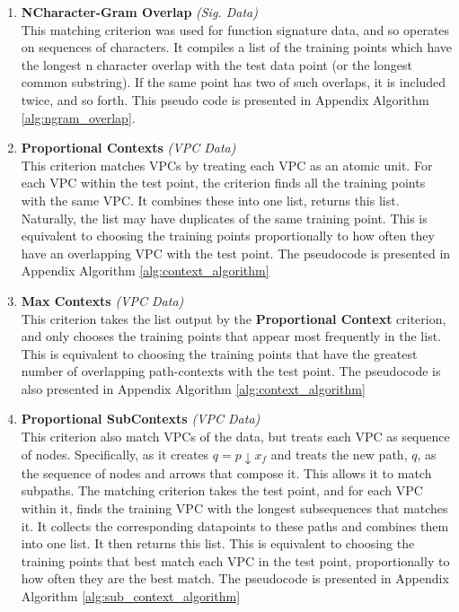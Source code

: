 \begin{enumerate}
    \item \textbf{NCharacter-Gram Overlap} \textit{(Sig. Data)} \\This matching criterion was used for function signature data, and so operates on sequences of characters. It compiles a list of the training points which have the longest n character overlap with the test data point (or the longest common substring). If the same point has two of such overlaps, it is included twice, and so forth. This pseudo code is presented in Appendix Algorithm \ref{alg:ngram_overlap}.
    \item \textbf{Proportional Contexts} \textit{(VPC Data)}\\This criterion matches VPCs by treating each VPC as an atomic unit. For each VPC within the test point, the criterion finds all the training points with the same VPC. It combines these into one list, returns this list. Naturally, the list may have duplicates of the same training point. This is equivalent to choosing the training points proportionally to how often they have an overlapping VPC with the test point. The pseudocode is presented in Appendix Algorithm \ref{alg:context_algorithm} 
    \item \textbf{Max Contexts} \textit{(VPC Data)}\\This criterion takes the list output by the \textbf{Proportional Context} criterion, and only chooses the training points that appear most frequently in the list. This is equivalent to choosing the training points that have the greatest number of overlapping path-contexts with the test point. The pseudocode is also presented in Appendix Algorithm \ref{alg:context_algorithm} 
    \item \textbf{Proportional SubContexts} \textit{(VPC Data)}\\This criterion also match VPCs of the data, but treats each VPC as sequence of nodes. Specifically, as it creates $q = p{\downarrow}x_f$ and treats the new path, $q$, as the sequence of nodes and arrows that compose it. This allows it to match subpaths. The matching criterion takes the test point, and for each VPC within it, finds the training VPC with the longest subsequences that matches it. It collects the corresponding datapoints to these paths and combines them into one list. It then returns this list. This is equivalent to choosing the training points that best match each VPC in the test point, proportionally to how often they are the best match. The pseudocode is presented in Appendix Algorithm \ref{alg:sub_context_algorithm} 

\end{enumerate}
